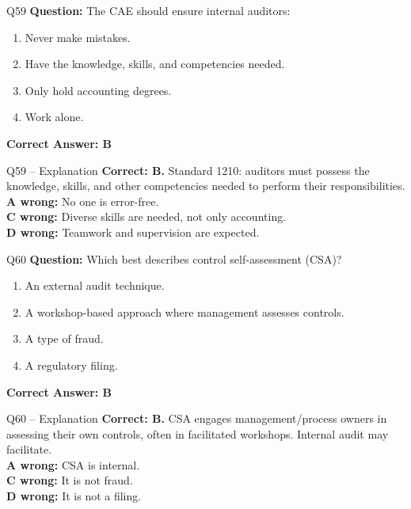 \documentclass[aspectratio=169,10pt]{beamer}
\begin{document}
	\begin{frame}[t]{Q59}
		\small
		\textbf{Question:} The CAE should ensure internal auditors:
		\begin{enumerate}[label=\Alph*.,itemsep=1pt,topsep=2pt]
			\item Never make mistakes.
			\item Have the knowledge, skills, and competencies needed.
			\item Only hold accounting degrees.
			\item Work alone.
		\end{enumerate}
		\vspace{4pt}
		\textbf{Correct Answer: B}
	\end{frame}
	
	\begin{frame}[t]{Q59 -- Explanation}
		\small
		\textbf{Correct: B.} Standard 1210: auditors must possess the knowledge, skills, and other competencies needed to perform their responsibilities. \\[4pt]
		\textbf{A wrong:} No one is error-free. \\[2pt]
		\textbf{C wrong:} Diverse skills are needed, not only accounting. \\[2pt]
		\textbf{D wrong:} Teamwork and supervision are expected.
	\end{frame}
	
	\begin{frame}[t]{Q60}
		\small
		\textbf{Question:} Which best describes control self-assessment (CSA)?
		\begin{enumerate}[label=\Alph*.,itemsep=1pt,topsep=2pt]
			\item An external audit technique.
			\item A workshop-based approach where management assesses controls.
			\item A type of fraud.
			\item A regulatory filing.
		\end{enumerate}
		\vspace{4pt}
		\textbf{Correct Answer: B}
	\end{frame}
	
	\begin{frame}[t]{Q60 -- Explanation}
		\small
		\textbf{Correct: B.} CSA engages management/process owners in assessing their own controls, often in facilitated workshops. Internal audit may facilitate. \\[4pt]
		\textbf{A wrong:} CSA is internal. \\[2pt]
		\textbf{C wrong:} It is not fraud. \\[2pt]
		\textbf{D wrong:} It is not a filing.
	\end{frame}
	
\end{document}
